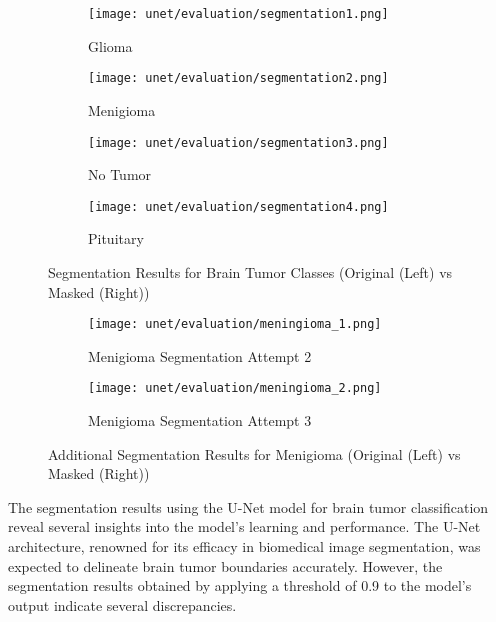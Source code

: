 \begin{figure}[H]
  \centering
  \begin{subfigure}[b]{0.23\textwidth}
    \centering
    \texttt{[image: unet/evaluation/segmentation1.png]}
    \caption{Glioma}
    \label{fig:glio_seg}
  \end{subfigure}
  \hfill
  \begin{subfigure}[b]{0.23\textwidth}
    \centering
    \texttt{[image: unet/evaluation/segmentation2.png]}
    \caption{Menigioma}
    \label{fig:meng_seg}
  \end{subfigure}
  \hfill
  \begin{subfigure}[b]{0.23\textwidth}
    \centering
    \texttt{[image: unet/evaluation/segmentation3.png]}
    \caption{No Tumor}
    \label{fig:no_tumor_seg}
  \end{subfigure}
  \hfill
  \begin{subfigure}[b]{0.23\textwidth}
    \centering
    \texttt{[image: unet/evaluation/segmentation4.png]}
    \caption{Pituitary}
    \label{fig:pitu_seg}
  \end{subfigure}
  \caption{Segmentation Results for Brain Tumor Classes (Original (Left) vs Masked (Right))}
  \label{fig:segmentation_results}
\end{figure}

\begin{figure}[H]
  \centering
  \begin{subfigure}[b]{0.23\textwidth}
    \centering
    \texttt{[image: unet/evaluation/meningioma\_1.png]}
    \caption{Menigioma Segmentation Attempt 2}
    \label{fig:meningioma_1}
  \end{subfigure}
  \begin{subfigure}[b]{0.23\textwidth}
    \centering
    \texttt{[image: unet/evaluation/meningioma\_2.png]}
    \caption{Menigioma Segmentation Attempt 3}
    \label{fig:mengioma_2}
  \end{subfigure}
  \caption{Additional Segmentation Results for Menigioma (Original (Left) vs Masked (Right))}
  \label{fig:meningioma_segmentation}
\end{figure}


The segmentation results using the U-Net model for brain tumor classification reveal several insights into the model's learning and performance. The U-Net architecture, renowned for its efficacy in biomedical image segmentation, was expected to delineate brain tumor boundaries accurately. However, the segmentation results obtained by applying a threshold of 0.9 to the model's output indicate several discrepancies.


